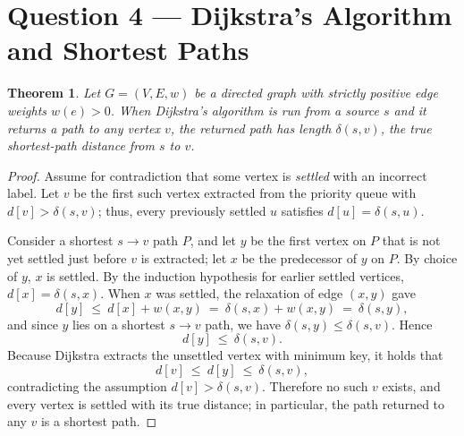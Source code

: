 \documentclass[11pt]{article}
\newtheorem{theorem}{Theorem}
\theoremstyle{definition}
\theoremstyle{remark}
\begin{document}
\section*{Question 4 — Dijkstra’s Algorithm and Shortest Paths}

\begin{theorem}
Let $G=(V,E,w)$ be a directed graph with strictly positive edge weights $w(e)>0$. When Dijkstra’s algorithm is run from a source $s$ and it returns a path to any vertex $v$, the returned path has length $\delta(s,v)$, the true shortest-path distance from $s$ to $v$.
\end{theorem}

\begin{proof}
Assume for contradiction that some vertex is \emph{settled} with an incorrect label. 
Let $v$ be the first such vertex extracted from the priority queue with $d[v]>\delta(s,v)$;
 thus, every previously settled $u$ satisfies $d[u]=\delta(s,u)$.

Consider a shortest $s\!\to\! v$ path $P$, and let $y$ be the first vertex on $P$ that is not yet settled just before $v$ is extracted; let $x$ be the predecessor of $y$ on $P$. By choice of $y$, $x$ is settled. By the induction hypothesis for earlier settled vertices, $d[x]=\delta(s,x)$. When $x$ was settled, the relaxation of edge $(x,y)$ gave
\[
d[y]\ \le\ d[x]+w(x,y)\ =\ \delta(s,x)+w(x,y)\ =\ \delta(s,y),
\]
and since $y$ lies on a shortest $s\!\to\! v$ path, we have $\delta(s,y)\le \delta(s,v)$. Hence
\[
d[y]\ \le\ \delta(s,v).
\]
Because Dijkstra extracts the unsettled vertex with minimum key, it holds that
\[
d[v]\ \le\ d[y]\ \le\ \delta(s,v),
\]
contradicting the assumption $d[v]>\delta(s,v)$. Therefore no such $v$ exists, and every vertex is settled with its true distance; in particular, the path returned to any $v$ is a shortest path.
\end{proof}
\end{document}
